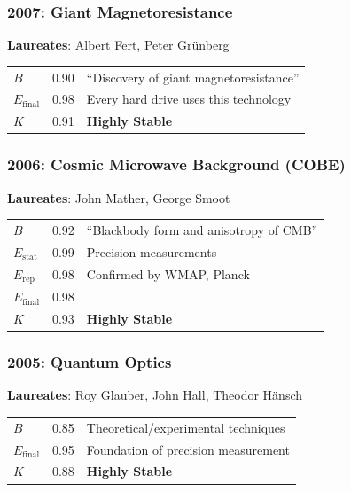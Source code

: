 \documentclass[11pt,a4paper]{article}
\begin{document}
\subsubsection{2007: Giant Magnetoresistance}
\textbf{Laureates}: Albert Fert, Peter Grünberg

\begin{center}
\begin{tabular}{lcl}
\toprule
$B$ & 0.90 & ``Discovery of giant magnetoresistance'' \\
$E_{\text{final}}$ & 0.98 & Every hard drive uses this technology \\
$K$ & 0.91 & \textbf{Highly Stable} \\
\bottomrule
\end{tabular}
\end{center}

\subsubsection{2006: Cosmic Microwave Background (COBE)}
\textbf{Laureates}: John Mather, George Smoot

\begin{center}
\begin{tabular}{lcl}
\toprule
$B$ & 0.92 & ``Blackbody form and anisotropy of CMB'' \\
$E_{\text{stat}}$ & 0.99 & Precision measurements \\
$E_{\text{rep}}$ & 0.98 & Confirmed by WMAP, Planck \\
\midrule
$E_{\text{final}}$ & 0.98 & \\
$K$ & 0.93 & \textbf{Highly Stable} \\
\bottomrule
\end{tabular}
\end{center}

\subsubsection{2005: Quantum Optics}
\textbf{Laureates}: Roy Glauber, John Hall, Theodor Hänsch

\begin{center}
\begin{tabular}{lcl}
\toprule
$B$ & 0.85 & Theoretical/experimental techniques \\
$E_{\text{final}}$ & 0.95 & Foundation of precision measurement \\
$K$ & 0.88 & \textbf{Highly Stable} \\
\bottomrule
\end{tabular}
\end{center}
\end{document}
